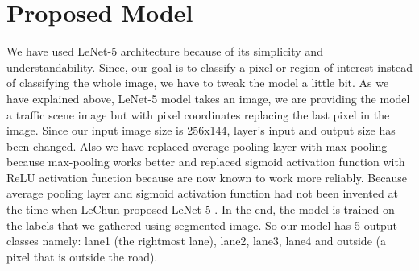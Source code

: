 \section{Proposed Model}
\par
We have used LeNet-5 architecture because of its simplicity and understandability. Since, our goal is to classify a pixel or region of interest instead of classifying the whole image, we have to tweak the model a little bit. As we have explained above, LeNet-5 model takes an image, we are providing the model a traffic scene image but with pixel coordinates replacing the last pixel in the image. Since our input image size is 256x144, layer's input and output size has been changed. Also we have replaced average pooling layer with max-pooling because max-pooling works better and replaced sigmoid activation function with ReLU activation function because are now known to work more reliably. Because average pooling layer and sigmoid activation function had not been invented at the time when LeChun proposed LeNet-5 \cite{lecun1998gradient}. In the end, the model is trained on the labels that we gathered using segmented image. So our model has 5 output classes namely: lane1 (the rightmost lane), lane2, lane3, lane4 and outside (a pixel that is outside the road).
